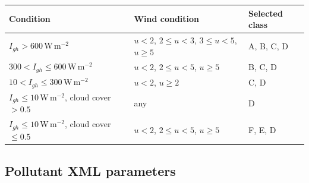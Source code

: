 \documentclass[11pt,a4paper]{article}
\newcommand{\unit}[1]{\,\mathrm{#1}}
\newcommand{\toprule}{\hline}
\newcommand{\midrule}{\hline}
\newcommand{\bottomrule}{\hline}
\begin{document}
\begin{center}
\small
\begin{tabular}{l l l}
\toprule
Condition & Wind condition & Selected class \\
\midrule
$I_{gh}>600\unit{W\,m^{-2}}$ & $u<2$, $2\leq u<3$, $3\leq u<5$, $u\geq5$ & A, B, C, D \\
$300<I_{gh}\leq600\unit{W\,m^{-2}}$ & $u<2$, $2\leq u<5$, $u\geq5$ & B, C, D \\
$10<I_{gh}\leq300\unit{W\,m^{-2}}$ & $u<2$, $u\geq2$ & C, D \\
$I_{gh}\leq10\unit{W\,m^{-2}}$, cloud cover $>0.5$ & any & D \\
$I_{gh}\leq10\unit{W\,m^{-2}}$, cloud cover $\leq0.5$ & $u<2$, $2\leq u<5$, $u\geq5$ & F, E, D \\
\bottomrule
\end{tabular}
\end{center}

\subsection{Pollutant XML parameters}
\end{document}
